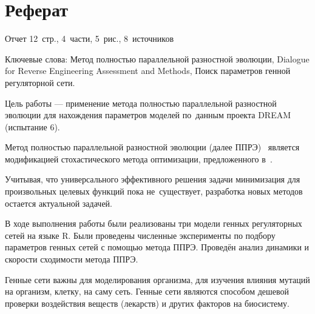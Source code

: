 \chapter*{Реферат}							%

Отчет 12~стр., 4~части, 5~рис., 8~источников

Ключевые слова: Метод полностью параллельной разностной эволюции, Dialogue for 
Reverse Engineering Assessment and Methods, Поиск параметров генной регуляторной 
сети.

Цель работы — применение метода полностью параллельной разностной эволюции для 
нахождения параметров моделей по~данным проекта DREAM (испытание 6).

Метод полностью параллельной разностной эволюции (далее ППРЭ)~\cite{bib2,bib5} 
является модификацией стохастического метода оптимизации, предложенного 
в~\cite{bib1}. 

Учитывая, что универсального эффективного решения задачи минимизация для 
произвольных целевых функций пока не~существует, разработка новых методов 
остается актуальной задачей. 

В ходе выполнения работы были реализованы три модели генных регуляторных сетей
на языке R. Были проведены численные эксперименты по подбору параметров генных
сетей с помощью метода ППРЭ. Проведён анализ динамики и скорости сходимости 
метода ППРЭ.

Генные сети важны для моделирования организма, для изучения влияния
мутаций на организм, клетку, на саму сеть. Генные сети являются способом дешевой
проверки воздействия веществ (лекарств) и других факторов на биосистему.

\clearpage
